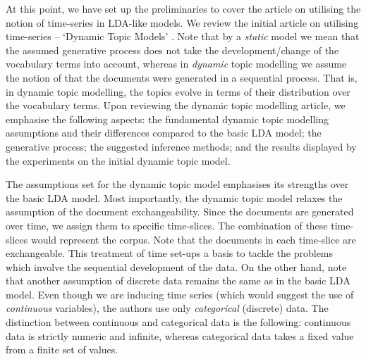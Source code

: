 \documentclass{mprop}
\begin{document}
\par At this point, we have set up the preliminaries to cover the article on utilising the notion of time-series in LDA-like models. We review the initial article on utilising time-series -- `Dynamic Topic Models' \cite{blei_2006}. Note that by a \textit{static} model we mean that the assumed generative process does not take the development/change of the vocabulary terms into account, whereas in \textit{dynamic} topic modelling we assume the notion of that the documents were generated in a sequential process. That is, in dynamic topic modelling, the topics evolve in terms of their distribution over the vocabulary terms. Upon reviewing the dynamic topic modelling article, we emphasise the following aspects: the fundamental dynamic topic modelling assumptions and their differences compared to the basic LDA model; the generative process; the suggested inference methods; and the results displayed by the experiments on the initial dynamic topic model.

\par The assumptions set for the dynamic topic model emphasises its strengths over the basic LDA model. Most importantly, the dynamic topic model relaxes the assumption of the document exchangeability. Since the documents are generated over time, we assign them to specific time-slices. The combination of these time-slices would represent the corpus. Note that the documents in each time-slice are exchangeable. This treatment of time set-ups a basis to tackle the problems which involve the sequential development of the data. On the other hand, note that another assumption of discrete data remains the same as in the basic LDA model. Even though we are inducing time series (which would suggest the use of \textit{continuous} variables), the authors use only \textit{categorical} (discrete) data. The distinction between continuous and categorical data is the following: continuous data is strictly numeric and infinite, whereas categorical data takes a fixed value from a finite set of values. 
\end{document}
